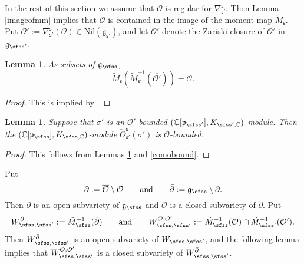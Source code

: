 \documentclass[12pt,a4paper]{amsart}
\newcommand{\CO}{{\mathcal {O}}}
\newcommand{\g}{\mathfrak g}
\newcommand{\p}{\mathfrak p}
\def\DD{\nabla}
\numberwithin{equation}{section}
\newtheorem{lem}[thm]{Lemma}
\theoremstyle{remark}
\begin{document}
In the rest of this section we assume that $\CO$ is regular for $\DD_{\mathsf s'}^{\mathsf s}$. Then Lemma \ref{imageofmm} implies that  $\CO$ is contained in the image of the moment map $\tilde M_{\mathsf s}$. Put  $\CO':=\DD_{\mathsf s'}^{\mathsf s}(\CO)\in  \mathrm{Nil}(\g_{\mathsf s'})$, and let  $\overline{\CO'}$ denote the Zariski closure of $\CO'$ in $\g_{\sfss'}$.


\begin{lem}\label{liftop000}
As subsets of $\g_\sfss$,
\[
  \tilde M_{\mathsf s}(\tilde M_{\mathsf s'}^{-1}(\overline{\CO'}))=\overline{\CO}.
\]
\end{lem}
\begin{proof}
This is implied by \cite[Theorems 5.2 and 5.6]{DKPC}.
\end{proof}


\begin{lem}\label{comobound2}
Suppose that $\sigma'$ is an $\CO'$-bounded $(\C[\p_{\sfss'}], K_{\sfss', \C})$-module.  Then the  $(\C[\p_{\sfss}], K_{\sfss, \C})$-module   $\check \Theta_{\mathsf s'}^{\mathsf s}(\sigma')$ is $\CO$-bounded.
\end{lem}
\begin{proof}
This follows from Lemmas \ref{liftop000} and \ref{comobound}. 
\end{proof}


Put
\[
\partial :=\overline \CO\setminus \CO\qquad\textrm{and}\qquad  \bar \partial :=\g_\sfss\setminus \partial.
\]
Then $\bar \partial$ is an open subvariety of $\g_\sfss$ and $\CO$ is a closed subvariety of $\bar \partial$.
Put
\[
W_{\sfss, \sfss'}^{\bar \partial}:=\tilde M_{\sfss}^{-1}(\bar \partial )
\qquad\textrm{and}\qquad
  W_{\sfss, \sfss'}^{\CO, \CO'}:=\tilde M_{\sfss}^{-1}(\CO)\cap  \tilde M_{\sfss'}^{-1}(\CO').
\]
Then $W_{\sfss, \sfss'}^{\bar \partial}$ is an open subvariety of $W_{\sfss, \sfss'}$, and the following lemma implies that $W_{\sfss, \sfss'}^{\CO, \CO'}$ is a closed subvariety of $W_{\sfss, \sfss'}^{\bar \partial}$.
\end{document}
